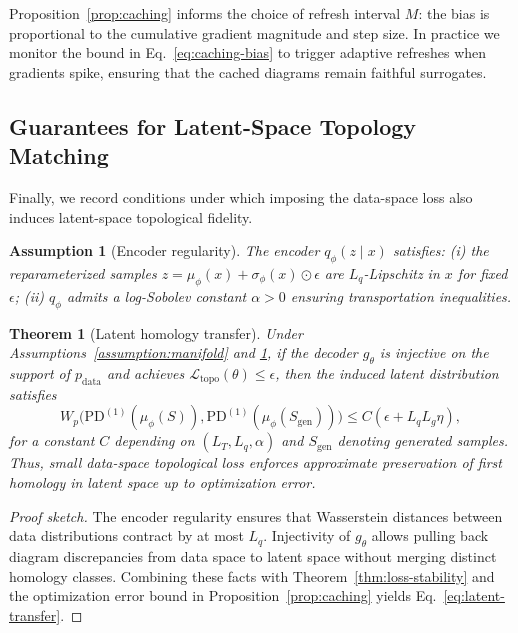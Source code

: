 \documentclass[11pt]{article}
\newtheorem{theorem}{Theorem}
\newtheorem{assumption}{Assumption}
\theoremstyle{definition}
\begin{document}
Proposition~\ref{prop:caching} informs the choice of refresh interval $M$: the bias is proportional to the cumulative gradient magnitude and step size. In practice we monitor the bound in Eq.~\eqref{eq:caching-bias} to trigger adaptive refreshes when gradients spike, ensuring that the cached diagrams remain faithful surrogates.

\subsection{Guarantees for Latent-Space Topology Matching}
Finally, we record conditions under which imposing the data-space loss also induces latent-space topological fidelity.

\begin{assumption}[Encoder regularity]
\label{assumption:encoder}
The encoder $q_\phi(z \mid x)$ satisfies: (i) the reparameterized samples $z = \mu_\phi(x) + \sigma_\phi(x) \odot \epsilon$ are $L_q$-Lipschitz in $x$ for fixed $\epsilon$; (ii) $q_\phi$ admits a log-Sobolev constant $\alpha>0$ ensuring transportation inequalities.
\end{assumption}

\begin{theorem}[Latent homology transfer]
\label{thm:latent}
Under Assumptions~\ref{assumption:manifold} and \ref{assumption:encoder}, if the decoder $g_\theta$ is injective on the support of $p_{\text{data}}$ and achieves $\mathcal{L}_{\text{topo}}(\theta) \leq \epsilon$, then the induced latent distribution satisfies
\begin{equation}
    W_p\big( \mathrm{PD}^{(1)}(\mu_\phi(S)), \mathrm{PD}^{(1)}(\mu_\phi(S_{\text{gen}})) \big) \leq C (\epsilon + L_q L_g \eta),
    \label{eq:latent-transfer}
\end{equation}
for a constant $C$ depending on $(L_T, L_q, \alpha)$ and $S_{\text{gen}}$ denoting generated samples. Thus, small data-space topological loss enforces approximate preservation of first homology in latent space up to optimization error.
\end{theorem}

\begin{proof}[Proof sketch]
The encoder regularity ensures that Wasserstein distances between data distributions contract by at most $L_q$. Injectivity of $g_\theta$ allows pulling back diagram discrepancies from data space to latent space without merging distinct homology classes. Combining these facts with Theorem~\ref{thm:loss-stability} and the optimization error bound in Proposition~\ref{prop:caching} yields Eq.~\eqref{eq:latent-transfer}.
\end{proof}
\end{document}
